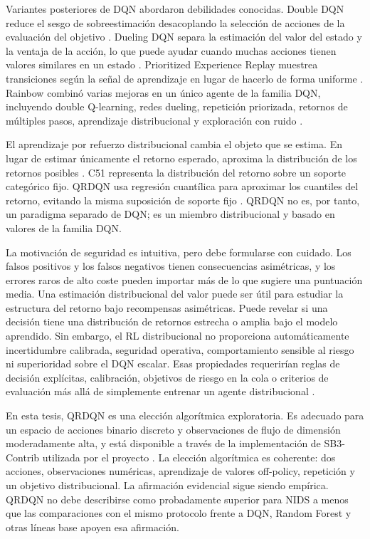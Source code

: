Variantes posteriores de DQN abordaron debilidades conocidas. Double DQN reduce el sesgo de sobreestimación desacoplando la selección de acciones de la evaluación del objetivo \parencite{VanHasselt2016DoubleDQN}. Dueling DQN separa la estimación del valor del estado y la ventaja de la acción, lo que puede ayudar cuando muchas acciones tienen valores similares en un estado \parencite{Wang2016DuelingDQN}. Prioritized Experience Replay muestrea transiciones según la señal de aprendizaje en lugar de hacerlo de forma uniforme \parencite{Schaul2016PER}. Rainbow combinó varias mejoras en un único agente de la familia DQN, incluyendo double Q-learning, redes dueling, repetición priorizada, retornos de múltiples pasos, aprendizaje distribucional y exploración con ruido \parencite{Hessel2018Rainbow}.

El aprendizaje por refuerzo distribucional cambia el objeto que se estima. En lugar de estimar únicamente el retorno esperado, aproxima la distribución de los retornos posibles \parencite{Bellemare2017DistributionalRL}. C51 representa la distribución del retorno sobre un soporte categórico fijo. QRDQN usa regresión cuantílica para aproximar los cuantiles del retorno, evitando la misma suposición de soporte fijo \parencite{Dabney2018QRDQN}. QRDQN no es, por tanto, un paradigma separado de DQN; es un miembro distribucional y basado en valores de la familia DQN.

La motivación de seguridad es intuitiva, pero debe formularse con cuidado. Los falsos positivos y los falsos negativos tienen consecuencias asimétricas, y los errores raros de alto coste pueden importar más de lo que sugiere una puntuación media. Una estimación distribucional del valor puede ser útil para estudiar la estructura del retorno bajo recompensas asimétricas. Puede revelar si una decisión tiene una distribución de retornos estrecha o amplia bajo el modelo aprendido. Sin embargo, el RL distribucional no proporciona automáticamente incertidumbre calibrada, seguridad operativa, comportamiento sensible al riesgo ni superioridad sobre el DQN escalar. Esas propiedades requerirían reglas de decisión explícitas, calibración, objetivos de riesgo en la cola o criterios de evaluación más allá de simplemente entrenar un agente distribucional \parencite{Bellemare2017DistributionalRL,Dabney2018QRDQN}.

En esta tesis, QRDQN es una elección algorítmica exploratoria. Es adecuado para un espacio de acciones binario discreto y observaciones de flujo de dimensión moderadamente alta, y está disponible a través de la implementación de SB3-Contrib utilizada por el proyecto \parencite{SB3ContribQRDQNDocs,GymnasiumDocs}. La elección algorítmica es coherente: dos acciones, observaciones numéricas, aprendizaje de valores off-policy, repetición y un objetivo distribucional. La afirmación evidencial sigue siendo empírica. QRDQN no debe describirse como probadamente superior para NIDS a menos que las comparaciones con el mismo protocolo frente a DQN, Random Forest y otras líneas base apoyen esa afirmación.

